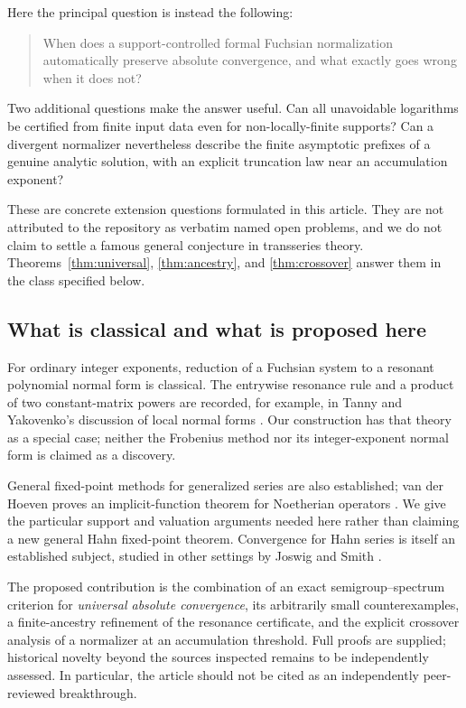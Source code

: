 \documentclass[11pt,a4paper]{article}
\numberwithin{equation}{section}
\theoremstyle{definition}
\theoremstyle{remark}
\begin{document}
Here the principal question is instead the following:
\begin{quote}
When does a support-controlled formal Fuchsian normalization automatically
preserve absolute convergence, and what exactly goes wrong when it does
not?
\end{quote}
Two additional questions make the answer useful. Can all unavoidable
logarithms be certified from finite input data even for non-locally-finite
supports? Can a divergent normalizer nevertheless describe the finite
asymptotic prefixes of a genuine analytic solution, with an explicit
truncation law near an accumulation exponent?

These are concrete extension questions formulated in this article. They
are not attributed to the repository as verbatim named open problems, and
we do not claim to settle a famous general conjecture in transseries theory.
Theorems~\ref{thm:universal}, \ref{thm:ancestry}, and
\ref{thm:crossover} answer them in the class specified below.

\subsection{What is classical and what is proposed here}
For ordinary integer exponents, reduction of a Fuchsian system to a
resonant polynomial normal form is classical. The entrywise resonance
rule and a product of two constant-matrix powers are recorded, for example,
in Tanny and Yakovenko's discussion of local normal forms
\cite[p.~6]{tanny-yakovenko}. Our construction has that theory as a special
case; neither the Frobenius method nor its integer-exponent normal form is
claimed as a discovery.

General fixed-point methods for generalized series are also established;
van der Hoeven proves an implicit-function theorem for Noetherian
operators \cite{vdh}. We give the particular support and valuation arguments
needed here rather than claiming a new general Hahn fixed-point theorem.
Convergence for Hahn series is itself an established subject, studied in
other settings by Joswig and Smith \cite{joswig-smith}.

The proposed contribution is the combination of an exact semigroup--spectrum
criterion for \emph{universal absolute convergence}, its arbitrarily small
counterexamples, a finite-ancestry refinement of the resonance certificate,
and the explicit crossover analysis of a normalizer at an accumulation
threshold. Full proofs are supplied; historical novelty beyond the sources
inspected remains to be independently assessed. In particular, the article
should not be cited as an independently peer-reviewed breakthrough.
\end{document}
